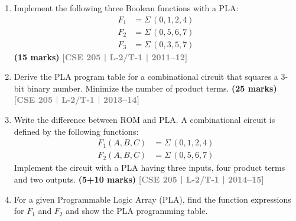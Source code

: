 \documentclass[12pt,a4paper]{article}
\newcommand{\yr}[1]{\hfill\textcolor{gray}{\small\textbf{[#1]}}}
\newcommand{\mk}[1]{\textcolor{orange!70!black}{\small\textbf{(#1 marks)}}}
\begin{document}
\begin{enumerate}

\item Implement the following three Boolean functions with a PLA:
\begin{align*}
  F_1 &= \Sigma\,(0,1,2,4) \\
  F_2 &= \Sigma\,(0,5,6,7) \\
  F_3 &= \Sigma\,(0,3,5,7)
\end{align*}
\mk{15} \yr{CSE 205 | L-2/T-1 | 2011--12}

\item Derive the PLA program table for a combinational circuit that squares a 3-bit binary number. Minimize the number of product terms.
\mk{25} \yr{CSE 205 | L-2/T-1 | 2013--14}


\item Write the difference between ROM and PLA. A combinational circuit is defined by the following functions:
\begin{align*}
  F_1(A,B,C) &= \Sigma\,(0,1,2,4) \\
  F_2(A,B,C) &= \Sigma\,(0,5,6,7)
\end{align*}
Implement the circuit with a PLA having three inputs, four product terms and two outputs.
\mk{5+10} \yr{CSE 205 | L-2/T-1 | 2014--15}


\item For a given Programmable Logic Array (PLA), find the function expressions for $F_1$ and $F_2$ and show the PLA programming table.

\begin{center}
\end{center}
\end{enumerate}
\end{document}
